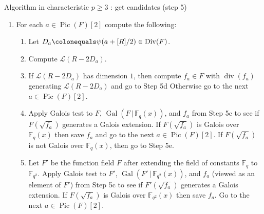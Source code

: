 \documentclass[xcolor=dvipsnames]{beamer}
\theoremstyle{plain}
\newcommand{\FF}{\mathbb{F}}
\DeclareMathOperator{\Div}{Div}
\DeclareMathOperator{\Pic}{Pic}
\DeclareMathOperator{\ddiv}{div}
\DeclareMathOperator{\Gal}{Gal}
\begin{document}
  \begin{frame}{Algorithm in characteristic $p\geq 3$ : get candidates (step 5)}
    \begin{enumerate}
      \item[5.]
        For each $a\in\Pic(F)[2]$ compute the
        following:
        \begin{enumerate}
          \item[(a)]
            Let $D_a\colonequals\psi(a+[R]/2)
            \in\Div(F)$.
          \item[(b)]
            Compute $\mathscr{L}(R-2D_a)$.
          \item[(c)]
            If $\mathscr{L}(R-2D_a)$ has dimension
            $1$, then compute
            $f_a\in F$ with $\ddiv(f_a)$
            generating $\mathscr{L}(R-2D_a)$
            and go to Step 5d
            Otherwise go to the next
            $a\in\Pic(F)[2]$.
          \item[(d)]
            Apply Galois test
            to $F$,
            $\Gal(F\,|\,\FF_q(x))$,
            and $f_a$
            from Step 5c
            to see if $F(\sqrt{f_a})$
            generates a Galois extension.
            If $F(\sqrt{f_a})$ is Galois over
            $\FF_q(x)$ then save $f_a$
            and
            go to the next
            $a\in\Pic(F)[2]$.
            If $F(\sqrt{f_a})$ is not Galois
            over $\FF_q(x)$, then go to
            Step 5e.
          \item[(e)]
            Let $F'$ be the function field
            $F$ after extending the field of
            constants $\FF_q$ to $\FF_{q^2}$.
            Apply Galois test
            to $F'$,
            $\Gal(F'\,|\,\FF_{q^2}(x))$,
            and $f_a$
            (viewed as an element of $F'$)
            from Step 5c
            to see if $F'(\sqrt{f_a})$
            generates a Galois extension.
            If $F(\sqrt{f_a})$ is Galois over
            $\FF_{q^2}(x)$ then save $f_a$.
            Go to the next
            $a\in\Pic(F)[2]$.
        \end{enumerate}
    \end{enumerate}
  \end{frame}
\end{document}
